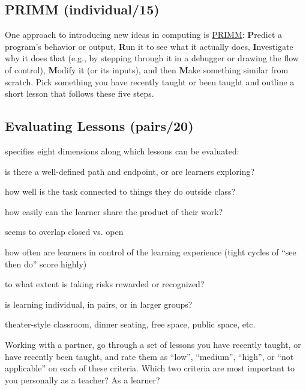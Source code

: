 \subsection{PRIMM (individual/15)}\label{primm-individual15}

One approach to introducing new ideas in computing is \href{http://blogs.kcl.ac.uk/cser/2017/09/01/primm-a-structured-approach-to-teaching-programming/}{PRIMM}:
\textbf{P}redict a program's behavior or output, \textbf{R}un it to see what it
actually does, \textbf{I}nvestigate why it does that (e.g., by stepping
through it in a debugger or drawing the flow of control), \textbf{M}odify
it (or its inputs), and then \textbf{M}ake something similar from scratch.
Pick something you have recently taught or been taught and outline a
short lesson that follows these five steps.

\subsection{Evaluating Lessons (pairs/20)}\label{evaluating-lessons-pairs20}

\cite{Mart2017} specifies eight dimensions along which lessons can be
evaluated:

\begin{description}
\tightlist
\item[Closed vs. open:]
is there a well-defined path and endpoint, or are learners
exploring?
\item[Cultural relevance:]
how well is the task connected to things they do outside class?
\item[Recognition:]
how easily can the learner share the product of their work?
\item[Space to play:]
seems to overlap closed vs. open
\item[Driver shift:]
how often are learners in control of the learning experience (tight
cycles of ``see then do'' score highly)
\item[Risk reward:]
to what extent is taking risks rewarded or recognized?
\item[Grouping:]
is learning individual, in pairs, or in larger groups?
\item[Session shape:]
theater-style classroom, dinner seating, free space, public space,
etc.
\end{description}

Working with a partner, go through a set of lessons you have recently
taught, or have recently been taught, and rate them as ``low'', ``medium'',
``high'', or ``not applicable'' on each of these criteria. Which two
criteria are most important to you personally as a teacher? As a
learner?

